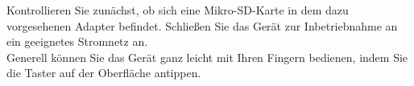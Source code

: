\label{ErsteSchritte}

Kontrollieren Sie zunächst, ob sich eine Mikro-SD-Karte in dem dazu vorgesehenen Adapter befindet. Schließen Sie das Gerät zur Inbetriebnahme an ein geeignetes Stromnetz an. \\
Generell können Sie das Gerät ganz leicht mit Ihren Fingern bedienen, indem Sie die Taster auf der Oberfläche antippen.